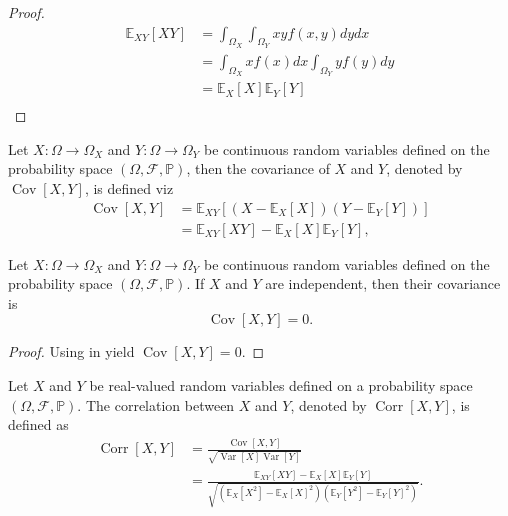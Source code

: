 \begin{proof}
	\begin{equation}
		\begin{split}
			\mathbb{E}_{XY}[XY] &= \int_{\Omega_X}\int_{\Omega_Y}x y f(x,y) dy dx\\
			&= \int_{\Omega_X} x f(x) dx\int_{\Omega_Y} yf(y) dy\\
			&= \mathbb{E}_X[X]\mathbb{E}_Y[Y]\\
		\end{split}
	\end{equation}
\end{proof}

\begin{definition}[Covariance]
	\label{def:covariance}
	Let $X: \Omega \to \Omega_X$ and $Y: \Omega \to \Omega_Y$ be continuous random variables defined on the probability space $(\Omega, \mathcal{F}, \mathbb{P})$, then the covariance of $X$ and $Y$, denoted by $\operatorname{Cov}[X,Y]$, is defined viz
	\begin{equation}
		\begin{split}
			\operatorname{Cov}[X,Y]&=\mathbb{E}_{XY}[(X-\mathbb{E}_X[X])(Y-\mathbb{E}_Y[Y])]\\
			&=\mathbb{E}_{XY}[XY]-\mathbb{E}_X[X]\mathbb{E}_Y[Y],
		\end{split}
	\end{equation}
\end{definition}
\begin{theorem}
	\label{theorem:covariance_of_independent_variables}
	Let $X: \Omega \to \Omega_X$ and $Y: \Omega \to \Omega_Y$ be continuous random variables defined on the probability space $(\Omega, \mathcal{F}, \mathbb{P})$. If $X$ and $Y$ are independent, then their covariance is
	\begin{equation}
		\operatorname{Cov}[X,Y] = 0.
	\end{equation}
	
\end{theorem}
\begin{proof}
	Using  in  yield $\operatorname{Cov}[X,Y]=0$.
\end{proof}

\begin{definition}[Correlation]
	Let $X$ and $Y$ be real-valued random variables defined on a probability space $(\Omega, \mathcal{F},\mathbb{P})$. The correlation between $X$ and $Y$, denoted by $\operatorname{Corr}[X,Y]$, is defined as
	\begin{equation}
		\begin{split}
			\operatorname{Corr}[X,Y] &= \frac{\operatorname{Cov}[X,Y]}{\sqrt{\operatorname{Var}[X]  \operatorname{Var}[Y]}} \\
			&= \frac{\mathbb{E}_{XY}[XY]-\mathbb{E}_X[X]\mathbb{E}_Y[Y]}{\sqrt{\left(\mathbb{E}_X[X^2] - \mathbb{E}_X[X]^2\right) \left(\mathbb{E}_Y[Y^2] - \mathbb{E}_Y[Y]^2\right)}}.
		\end{split}
	\end{equation}
\end{definition}

